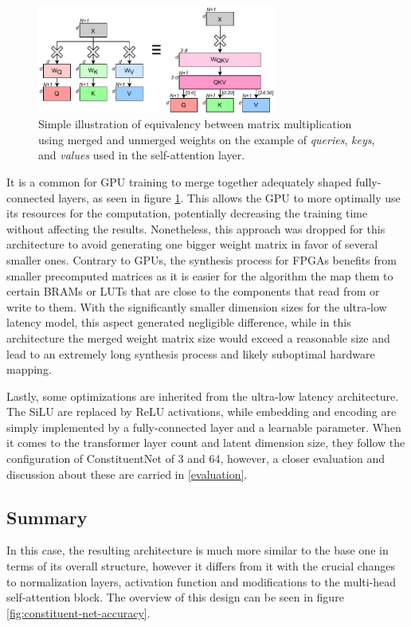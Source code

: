 \begin{figure}[hpt!]
  \centering
  \includegraphics[trim={0cm 0cm 0cm 0cm}, width=0.7\textwidth, center]{models/weight_merging.pdf}
  \caption{Simple illustration of equivalency between matrix multiplication using merged and unmerged weights on the example of \textit{queries}, \textit{keys}, and \textit{values} used in the self-attention layer.}
  \label{fig:weight-merging}
\end{figure}

It is a common for GPU training to merge together adequately shaped fully-connected layers, as seen in figure \ref{fig:weight-merging}. This allows the GPU to more optimally use its resources for the computation, potentially decreasing the training time without affecting the results. Nonetheless, this approach was dropped for this architecture to avoid generating one bigger weight matrix in favor of several smaller ones. Contrary to GPUs, the synthesis process for FPGAs benefits from smaller precomputed matrices as it is easier for the algorithm the map them to certain BRAMs or LUTs that are close to the components that read from or write to them. With the significantly smaller dimension sizes for the ultra-low latency model, this aspect generated negligible difference, while in this architecture the merged weight matrix size would exceed a reasonable size and lead to an extremely long synthesis process and likely suboptimal hardware mapping.

Lastly, some optimizations are inherited from the ultra-low latency architecture. The SiLU are replaced by ReLU activations, while embedding and encoding are simply implemented by a fully-connected layer and a learnable parameter. When it comes to the transformer layer count and latent dimension size, they follow the configuration of ConstituentNet of 3 and 64, however, a closer evaluation and discussion about these are carried in \cref{evaluation}.

\subsection{Summary}
In this case, the resulting architecture is much more similar to the base one in terms of its overall structure, however it differs from it with the crucial changes to normalization layers, activation function and modifications to the multi-head self-attention block. The overview of this design can be seen in figure \ref{fig:constituent-net-accuracy}.

